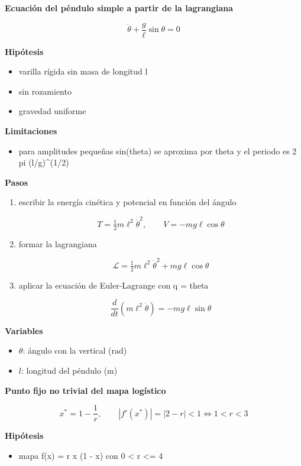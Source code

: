 \documentclass[10pt,openany]{book}
\begin{document}
\begin{tcolorbox}[title={Desarrollos del modelo}, studiumdef, breakable]
\noindent\textbf{Ecuación del péndulo simple a partir de la lagrangiana}

\[
\ddot{\theta} + \frac{g}{\ell}\sin\theta = 0
\]

\noindent\textbf{Hipótesis}
\begin{itemize}
\item varilla rígida sin masa de longitud l
\item sin rozamiento
\item gravedad uniforme
\end{itemize}

\noindent\textbf{Limitaciones}
\begin{itemize}
\item para amplitudes pequeñas sin(theta) se aproxima por theta y el periodo es 2 pi (l/g)\textasciicircum{}(1/2)
\end{itemize}

\noindent\textbf{Pasos}
\begin{enumerate}
\item
escribir la energía cinética y potencial en función del ángulo

\[
T = \tfrac12 m\ell^{2}\dot{\theta}^{2},\qquad V = -m g \ell\cos\theta
\]
\item
formar la lagrangiana

\[
\mathcal{L} = \tfrac12 m\ell^{2}\dot{\theta}^{2} + m g \ell\cos\theta
\]
\item
aplicar la ecuación de Euler-Lagrange con q = theta

\[
\frac{d}{dt}\left(m\ell^{2}\dot{\theta}\right) = -m g \ell \sin\theta
\]
\end{enumerate}

\noindent\textbf{Variables}
\begin{itemize}
\item $\theta$: ángulo con la vertical ($\mathrm{rad}$)
\item $l$: longitud del péndulo ($\mathrm{m}$)
\end{itemize}



\noindent\textbf{Punto fijo no trivial del mapa logístico}

\[
x^{*} = 1 - \frac{1}{r},\qquad \left|f'(x^{*})\right| = |2 - r| < 1 \iff 1 < r < 3
\]

\noindent\textbf{Hipótesis}
\begin{itemize}
\item mapa f(x) = r x (1 - x) con 0 < r <= 4
\end{itemize}


\end{tcolorbox}
\end{document}
